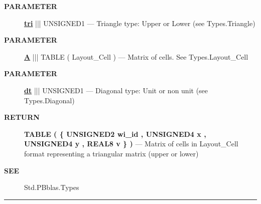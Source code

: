 \par
\begin{description}
\item [\colorbox{tagtype}{\color{white} \textbf{\textsf{PARAMETER}}}] \textbf{\underline{tri}} ||| UNSIGNED1 --- Triangle type: Upper or Lower (see Types.Triangle)
\item [\colorbox{tagtype}{\color{white} \textbf{\textsf{PARAMETER}}}] \textbf{\underline{A}} ||| TABLE ( Layout\_Cell ) --- Matrix of cells. See Types.Layout\_Cell
\item [\colorbox{tagtype}{\color{white} \textbf{\textsf{PARAMETER}}}] \textbf{\underline{dt}} ||| UNSIGNED1 --- Diagonal type: Unit or non unit (see Types.Diagonal)
\end{description}







\par
\begin{description}
\item [\colorbox{tagtype}{\color{white} \textbf{\textsf{RETURN}}}] \textbf{TABLE ( \{ UNSIGNED2 wi\_id , UNSIGNED4 x , UNSIGNED4 y , REAL8 v \} )} --- Matrix of cells in Layout\_Cell format representing a triangular matrix (upper or lower)
\end{description}







\par
\begin{description}
\item [\colorbox{tagtype}{\color{white} \textbf{\textsf{SEE}}}] Std.PBblas.Types
\end{description}



\rule{\linewidth}{0.5pt}
